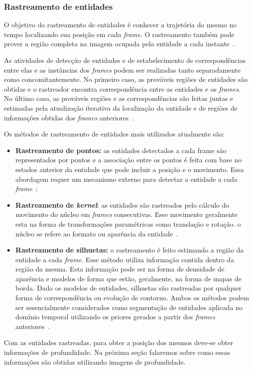 
\subsubsection{Rastreamento de entidades}

	O objetivo do rastreamento de entidades é conhecer a trajetória do mesmo no tempo localizando sua posição em cada \textit{frame}. O rastreamento também pode prover a região completa na imagem ocupada pela entidade a cada instante~\cite{yilmaz}. 

	As atividades de detecção de entidades e de estabelecimento de correspondências entre elas e as instâncias dos \textit{frames} podem ser realizadas tanto separadamente como concomitantemente. No primeiro caso, as prováveis regiões de entidades são obtidas e o rastreador encontra correspondência entre as entidades e os \textit{frames}. No último caso, as prováveis regiões e as correspondências são feitas juntas e estimadas pela atualização iterativa da localização da entidade e de regiões de informações obtidas dos \textit{frames} anteriores~\cite{yilmaz}.

	Os métodos de rastreamento de entidades mais utilizados atualmente são:

	\begin{itemize}
		\item \textbf{Rastreamento de pontos:} as entidades detectados a cada frame são representados por pontos e a associação entre os pontos é feita com base no estados anterior da entidade que pode incluir a posição e o movimento. Essa abordagem requer um mecanismo externo para detectar a entidade a cada \textit{frame}~\cite{yilmaz};

		\item \textbf{Rastreamento de \textit{kernel}}: as entidades são rastreados pelo cálculo do movimento do núcleo em \textit{frames} consecutivas. Esse movimento geralmente esta na forma de transformações paramétricas como translação e rotação. o núcleo se refere ao formato ou aparência da entidade~\cite{yilmaz}.

		\item \textbf{Rastreamento de silhuetas:} o rastreamento é feito estimando a região da entidade a cada \textit{frame}. Esse método utiliza informação contida dentro da região da mesma. Esta informação pode ser na forma de densidade de aparência e modelos de forma que estão, geralmente, na forma de mapas de borda. Dado os modelos de entidades, silhuetas são rastreadas por qualquer forma de correspondência ou evolução de contorno. Ambos os métodos podem ser essencialmente considerados como segmentação de entidades aplicada no domínio temporal utilizando os priores gerados a partir dos \textit{frames} anteriores~\cite{yilmaz}.
	\end{itemize}

	Com as entidades rastreadas, para obter a posição dos mesmos deve-se obter informações de profundidade. Na próxima seção falaremos sobre como essas informações são obtidas utilizando imagens de profundidade.




